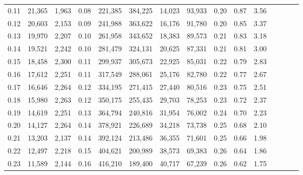 \begin{tabular}{rrrcrrrrrrrrrrr}
0.11 &  21,365 &  1,963 &                                       0.08 &  221,385 &  384,225 &   14,023 &   93,933 &  0.20 &  0.87 &                         3.56 \\
0.12 &  20,603 &  2,153 &                                       0.09 &  241,988 &  363,622 &   16,176 &   91,780 &  0.20 &  0.85 &                         3.37 \\
0.13 &  19,970 &  2,207 &                                       0.10 &  261,958 &  343,652 &   18,383 &   89,573 &  0.21 &  0.83 &                         3.18 \\
0.14 &  19,521 &  2,242 &                                       0.10 &  281,479 &  324,131 &   20,625 &   87,331 &  0.21 &  0.81 &                         3.00 \\
0.15 &  18,458 &  2,300 &                                       0.11 &  299,937 &  305,673 &   22,925 &   85,031 &  0.22 &  0.79 &                         2.83 \\
0.16 &  17,612 &  2,251 &                                       0.11 &  317,549 &  288,061 &   25,176 &   82,780 &  0.22 &  0.77 &                         2.67 \\
0.17 &  16,646 &  2,264 &                                       0.12 &  334,195 &  271,415 &   27,440 &   80,516 &  0.23 &  0.75 &                         2.51 \\
0.18 &  15,980 &  2,263 &                                       0.12 &  350,175 &  255,435 &   29,703 &   78,253 &  0.23 &  0.72 &                         2.37 \\
0.19 &  14,619 &  2,251 &                                       0.13 &  364,794 &  240,816 &   31,954 &   76,002 &  0.24 &  0.70 &                         2.23 \\
0.20 &  14,127 &  2,264 &                                       0.14 &  378,921 &  226,689 &   34,218 &   73,738 &  0.25 &  0.68 &                         2.10 \\
0.21 &  13,203 &  2,137 &                                       0.14 &  392,124 &  213,486 &   36,355 &   71,601 &  0.25 &  0.66 &                         1.98 \\
0.22 &  12,497 &  2,218 &                                       0.15 &  404,621 &  200,989 &   38,573 &   69,383 &  0.26 &  0.64 &                         1.86 \\
0.23 &  11,589 &  2,144 &                                       0.16 &  416,210 &  189,400 &   40,717 &   67,239 &  0.26 &  0.62 &                         1.75 \\

\end{tabular}
